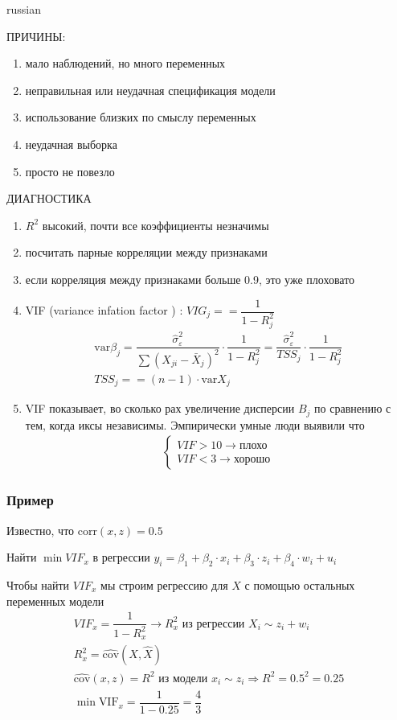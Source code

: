 \documentclass{article}
\begin{document}
\begin{otherlanguage*}{russian}
\begin{itemize}
ПРИЧИНЫ:
\begin{enumerate}
\item мало наблюдений, но много переменных
\item неправильная или неудачная спецификация модели 
\item использование близких по смыслу переменных 
\item неудачная выборка
\item просто не повезло
\end{enumerate}
ДИАГНОСТИКА
\begin{enumerate}
\item $ R ^ 2 $ высокий, почти все коэффициенты незначимы 
\item посчитать парные корреляции между признаками 
\item если корреляция между признаками больше 0.9, это уже плоховато
\item VIF (variance infation factor ) : $ VIG_j == \dfrac{1}{1 - R^2_j} $ 
\begin{align*}
\text{var} \beta_j = \dfrac{\hat \sigma^2_{\varepsilon}}{\sum (X_{ji} - \bar{X}_j)^2} \cdot \dfrac{1}{1 - R^2_j} = \dfrac{\hat \sigma^2_{\varepsilon}}{TSS_j} \cdot \dfrac{1}{1 - R^2_j} \\
TSS_j == (n - 1) \cdot \text{var} X_j
\end{align*}
\item VIF показывает, во сколько рах увеличение дисперсии $ B_j $ по сравнению с тем, когда иксы независимы. Эмпирически умные люди выявили что 
\begin{align*}
\begin{cases}
VIF > 10 \rightarrow \text{плохо} \\
VIF < 3 \rightarrow \text{хорошо}
\end{cases}
\end{align*}
\end{enumerate}
\end{itemize}
\subsubsection*{Пример}
Известно, что $ \text{corr} (x, z) = 0.5 $ 

Найти $ \min VIF_x$ в регрессии $ y_i = \beta_1 + \beta_2 \cdot x_i + \beta_3 \cdot z_i + \beta_4 \cdot w_i + u_i $ 

Чтобы найти $ VIF_x $ мы строим регрессию для $ X $ с помощью остальных переменных модели
\begin{align*}
VIF_x = \dfrac{1}{1 - R^2_x} \rightarrow R^2_x \text{ из регрессии } X_i \sim z_i + w_i \\
R^2_x = \widehat{\text{cov}} (X, \hat X) \\
\widehat{\text{cov}} (x, z) = R ^ 2  \text{ из модели } x_i \sim z_i \Rightarrow R^2 = 0.5 ^ 2 = 0.25 \\
\min \text{VIF}_x = \dfrac{1}{1 - 0.25} = \dfrac{4}{3}
\end{align*}

\end{otherlanguage*}
\end{document}
